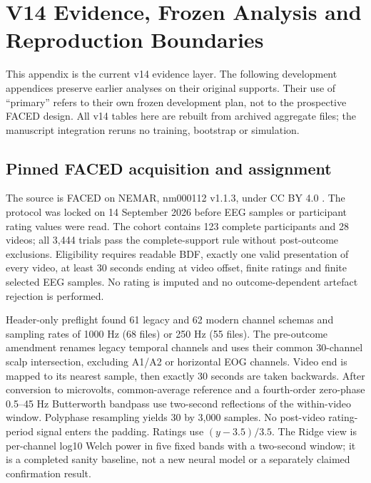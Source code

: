 \section{V14 Evidence, Frozen Analysis and Reproduction Boundaries}
\label{app:v14}
This appendix is the current v14 evidence layer. The following development
appendices preserve earlier analyses on their original supports. Their use of
``primary'' refers to their own frozen development plan, not to the prospective
FACED design. All v14 tables here are rebuilt from archived aggregate files;
the manuscript integration reruns no training, bootstrap or simulation.

\subsection{Pinned FACED acquisition and assignment}
The source is FACED on NEMAR, nm000112 v1.1.3, under CC BY 4.0
\citep{chen2023faced,nemar2026faced}. The protocol was locked on 14 September
2026 before EEG samples or participant rating values were read. The cohort
contains 123 complete participants and 28 videos; all 3,444 trials pass the
complete-support rule without post-outcome exclusions. Eligibility requires
readable BDF, exactly one valid presentation of every video, at least 30 seconds
ending at video offset, finite ratings and finite selected EEG samples. No
rating is imputed and no outcome-dependent artefact rejection is performed.

Header-only preflight found 61 legacy and 62 modern channel schemas and
sampling rates of 1000 Hz (68 files) or 250 Hz (55 files). The pre-outcome
amendment renames legacy temporal channels and uses their common 30-channel
scalp intersection, excluding A1/A2 or horizontal EOG channels. Video end is
mapped to its nearest sample, then exactly 30 seconds are taken backwards.
After conversion to microvolts, common-average reference and a fourth-order
zero-phase 0.5--45 Hz Butterworth bandpass use two-second reflections of the
within-video window. Polyphase resampling yields 30 by 3,000 samples.
No post-video rating-period signal enters the padding. Ratings use
$(y-3.5)/3.5$. The Ridge view is per-channel log10 Welch power in five fixed
bands with a two-second window; it is a completed sanity baseline, not a new
neural model or a separately claimed confirmation result.

